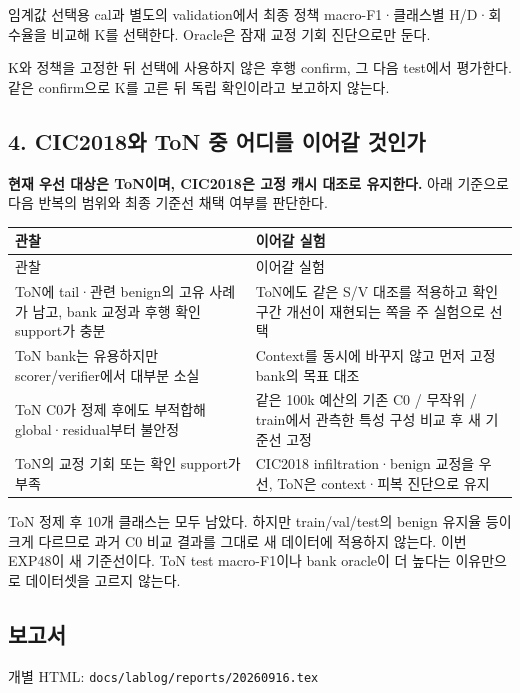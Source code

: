 \par\noindent \textbullet\enspace 임계값 선택용 cal과 별도의 validation에서 최종 정책 macro-F1·클래스별 H/\allowbreak{}D·회수율을 비교해 K를 선택한다. Oracle은 잠재 교정 기회 진단으로만 둔다.


\par\noindent \textbullet\enspace K와 정책을 고정한 뒤 선택에 사용하지 않은 후행 confirm, 그 다음 test에서 평가한다. 같은 confirm으로 K를 고른 뒤 독립 확인이라고 보고하지 않는다.


\subsection{4. CIC2018와 ToN 중 어디를 이어갈 것인가}
\textbf{현재 우선 대상은 ToN이며, CIC2018은 고정 캐시 대조로 유지한다.} 아래 기준으로 다음 반복의 범위와 최종 기준선 채택 여부를 판단한다.

\begingroup
\footnotesize
\begin{longtable}{>{\raggedright\arraybackslash}p{}>{\raggedright\arraybackslash}p{}}
\toprule
관찰 & 이어갈 실험 \\ \midrule
\endfirsthead
관찰 & 이어갈 실험 \\ \midrule
\endhead
{}ToN에 tail·관련 benign의 고유 사례가 남고, bank 교정과 후행 확인 support가 충분 & ToN에도 같은 S/\allowbreak{}V 대조를 적용하고 확인 구간 개선이 재현되는 쪽을 주 실험으로 선택 \\
{}ToN bank는 유용하지만 scorer/\allowbreak{}verifier에서 대부분 소실 & Context를 동시에 바꾸지 않고 먼저 고정 bank의 목표 대조 \\
{}ToN C0가 정제 후에도 부적합해 global·residual부터 불안정 & 같은 100k 예산의 기존 C0 /\allowbreak{} 무작위 /\allowbreak{} train에서 관측한 특성 구성 비교 후 새 기준선 고정 \\
{}ToN의 교정 기회 또는 확인 support가 부족 & CIC2018 infiltration·benign 교정을 우선, ToN은 context·피복 진단으로 유지 \\
\bottomrule
\end{longtable}
\endgroup
ToN 정제 후 10개 클래스는 모두 남았다. 하지만 train/\allowbreak{}val/\allowbreak{}test의 benign 유지율 등이 크게 다르므로 과거 C0 비교 결과를 그대로 새 데이터에 적용하지 않는다. 이번 EXP48이 새 기준선이다. ToN test macro-F1이나 bank oracle이 더 높다는 이유만으로 데이터셋을 고르지 않는다.

\subsection{보고서}
\par\noindent \textbullet\enspace 개별 HTML: \texttt{docs/\allowbreak{}\allowbreak{}lab\allowbreak{}log/\allowbreak{}\allowbreak{}repo\allowbreak{}rts/\allowbreak{}\allowbreak{}2026\allowbreak{}0916.\allowbreak{}tex\allowbreak{}}


